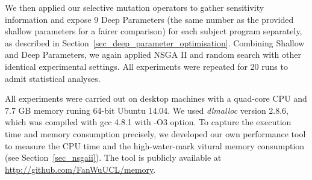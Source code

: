 We then applied our selective mutation operators to gather sensitivity information and expose 9 Deep Parameters (the same number as the provided shallow parameters for a fairer comparison) for each subject program separately, as described in Section~\ref{sec_deep_parameter_optimisation}. Combining Shallow and Deep Parameters, we again applied NSGA II and random search with other identical experimental settings. All experiments were repeated for 20 runs to admit statistical analyses. 

All experiments were carried out on desktop machines with a quad-core CPU and 7.7 GB memory runing 64-bit Ubuntu 14.04. We used \emph{dlmalloc} version 2.8.6, which was compiled with gcc 4.8.1 with -O3 option. To capture the execution time and memory consumption precisely, we developed our own performance tool to measure the CPU time and the high-water-mark vitural memory consumption (see Section~\ref{sec_nsgaii}). The tool is publicly available at \url{http://github.com/FanWuUCL/memory}.

